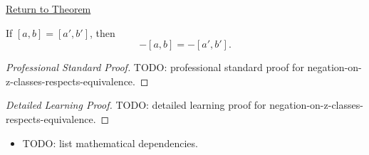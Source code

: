 \newpage
{}
\label{prf:negation-on-z-classes-respects-equivalence}

\begin{remark*}[Return]
\hyperref[lem:negation-on-z-classes-respects-equivalence]{Return to Theorem}
\end{remark*}

\begin{lemma*}
If $[a,b]=[a',b']$, then
\[
-[a,b]=-[a',b'].
\]
\end{lemma*}

\begin{proof}[Professional Standard Proof]
\LRAProofBodyStart
TODO: professional standard proof for negation-on-z-classes-respects-equivalence.
\end{proof}

\begin{proof}[Detailed Learning Proof]
\LRAProofBodyStart
TODO: detailed learning proof for negation-on-z-classes-respects-equivalence.
\end{proof}

\begin{remark*}
\end{remark*}

\begin{dependencies}
\begin{itemize}
  \item TODO: list mathematical dependencies.
\end{itemize}
\end{dependencies}

\clearpage
